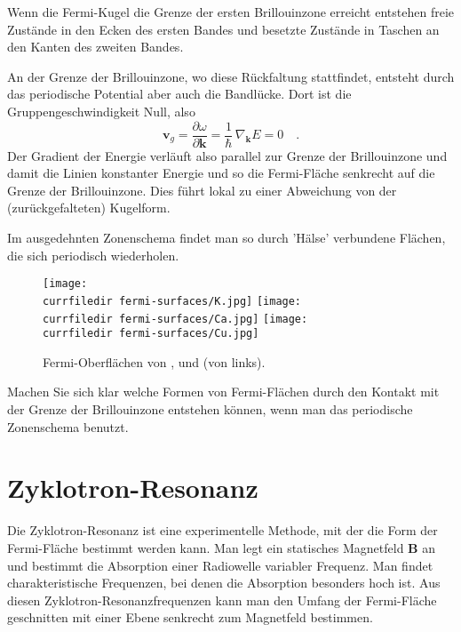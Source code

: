 \begin{marginfigure}
   \caption{Wenn die Fermi-Kugel die Grenze der ersten Brillouinzone erreicht entstehen freie Zustände in den Ecken des ersten Bandes und besetzte Zustände in Taschen an den Kanten des zweiten Bandes. \label{fig:4_fermi_sphere_BZ_sketch}}
\end{marginfigure}


An der Grenze der Brillouinzone, wo diese Rückfaltung stattfindet, entsteht durch das periodische Potential aber auch die Bandlücke. Dort ist die Gruppengeschwindigkeit Null, also 
\begin{equation}
 \mathbf{v}_g = \frac{\partial \omega}{\partial \mathbf{k}} = \frac{1}{\hbar} \, \nabla_\mathbf{k} E = 0  \quad .
\end{equation}
Der Gradient der Energie verläuft also parallel zur Grenze der Brillouinzone und damit die Linien konstanter Energie und so die Fermi-Fläche senkrecht auf die Grenze der Brillouinzone. Dies führt lokal zu einer Abweichung von der (zurückgefalteten) Kugelform. 

Im ausgedehnten Zonenschema findet man so durch 'Hälse' verbundene Flächen, die sich periodisch wiederholen.


\begin{figure}
   \texttt{[image: \\currfiledir fermi-surfaces/K.jpg]}
  \hspace*{4mm}
   \texttt{[image: \\currfiledir fermi-surfaces/Ca.jpg]}
   \hspace*{4mm}
   \texttt{[image: \\currfiledir fermi-surfaces/Cu.jpg]}

   \caption{Fermi-Oberflächen von ,  und  (von links). \cite{Choy00_fermi_surfaces} }
\end{figure}
    

\begin{questions}
   \item Machen Sie sich klar welche Formen von Fermi-Flächen durch den Kontakt mit der Grenze der Brillouinzone entstehen können, wenn man das periodische Zonenschema benutzt.
\end{questions}

\section{Zyklotron-Resonanz}

Die Zyklotron-Resonanz ist eine experimentelle Methode, mit der die Form der Fermi-Fläche bestimmt werden kann. Man legt ein statisches Magnetfeld $\mathbf{B}$ an und bestimmt die Absorption einer Radiowelle variabler Frequenz. Man findet charakteristische Frequenzen, bei denen die Absorption besonders hoch ist. Aus diesen Zyklotron-Resonanzfrequenzen kann man den Umfang der Fermi-Fläche geschnitten mit einer Ebene senkrecht zum Magnetfeld bestimmen.


